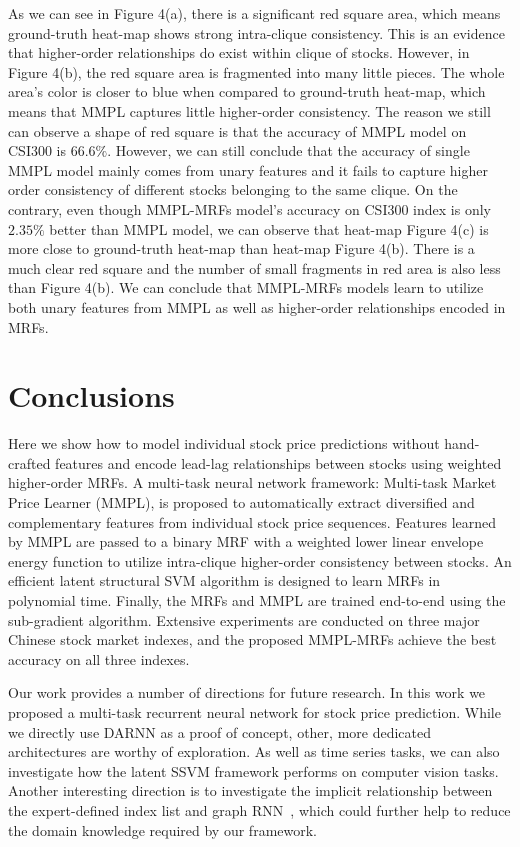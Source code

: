 As we can see in Figure 4(a), there is a significant red square
area, which means ground-truth heat-map shows strong intra-clique
consistency. This is an evidence that higher-order relationships
do exist within clique of stocks. However, in Figure 4(b), the red
square area is fragmented into many little pieces. The whole
area's color is closer to blue when compared to ground-truth
heat-map, which means that MMPL captures little higher-order consistency.
The reason we still can observe a shape of red square
is that the accuracy of MMPL model on CSI300 is $66.6\%$.
However, we can still conclude that the accuracy of single MMPL
model mainly comes from unary features and it fails to capture
higher order consistency of different stocks belonging to the same clique.
On the contrary, even though MMPL-MRFs model's accuracy on CSI300
index is only $2.35\%$ better than MMPL model, we can observe
that heat-map Figure 4(c) is more close to ground-truth heat-map than
heat-map Figure 4(b). There is a much clear red square and the number of
small fragments in red area is also less than Figure 4(b). We can
conclude that MMPL-MRFs models learn to utilize both unary
features from MMPL as well as higher-order relationships encoded
in MRFs.

\section{Conclusions}
\label{sec:conc}

Here we show how to model individual stock price predictions
without hand-crafted features and encode lead-lag relationships
between stocks using weighted higher-order MRFs. A multi-task
neural network framework: Multi-task Market Price Learner (MMPL),
is proposed to automatically extract diversified and
complementary features from individual stock price sequences.
Features learned by MMPL are passed to a binary MRF with a
weighted lower linear envelope energy function to utilize
intra-clique higher-order consistency between stocks. An
efficient latent structural SVM algorithm is designed to learn
MRFs in polynomial time. Finally, the MRFs and MMPL are trained
end-to-end using the sub-gradient algorithm. Extensive
experiments are conducted on three major Chinese stock market
indexes, and the proposed MMPL-MRFs achieve the best accuracy on
all three indexes.

Our work provides a number of directions for future research. In
this work we proposed a multi-task recurrent neural network for
stock price prediction. While we directly use DARNN as a proof of
concept, other, more dedicated architectures are worthy of
exploration. As well as time series tasks, we can also
investigate how the latent SSVM framework performs on computer
vision tasks. Another interesting direction is to investigate the
implicit relationship between the expert-defined index list and
graph RNN~\cite{you2018graphrnn}, which could further help to
reduce the domain knowledge required by our framework.

